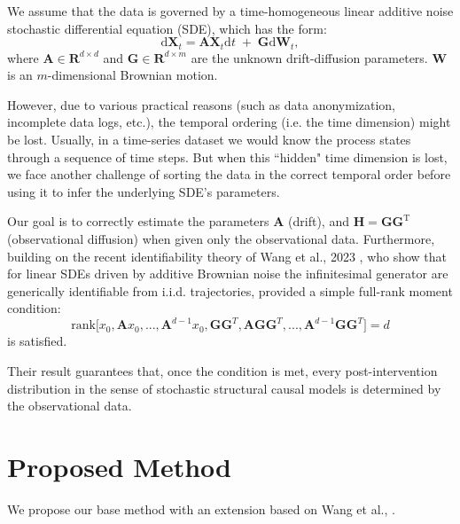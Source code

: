 \documentclass[a4paper, 11pt]{article}
\begin{document}
\begin{sloppypar}
We assume that the data is governed by a time-homogeneous linear additive noise stochastic
differential equation (SDE), which has the form:
\[
\mathrm{d}\mathbf{X}_t 
= 
\mathbf{A}\mathbf{X}_t\mathrm{d}t 
\;+\; 
\mathbf{G}\mathrm{d}\mathbf{W}_t,
\]
where $\mathbf{A} \in \mathbf{R}^{d \times d}$ and $\mathbf{G} \in \mathbf{R}^{d \times m}$ are the 
unknown drift-diffusion parameters. $\mathbf{W}$ is an $m$-dimensional Brownian motion.

However, due to various practical reasons (such as data anonymization, 
incomplete data logs, etc.), the temporal ordering
(i.e. the time dimension) might be lost. Usually, in a time-series dataset we
would know the process states through a sequence of time steps. But when this ``hidden" time
dimension is lost, we face another challenge of sorting the data in the correct temporal order
before using it to infer the underlying SDE's parameters.

Our goal is to correctly estimate the parameters $\mathbf{A}$ (drift), and
$\mathbf{H} = \mathbf{GG}^{\text{T}}$ (observational diffusion) when given only the
observational data. Furthermore, building on the recent identifiability theory of Wang et al., 2023
\cite{NEURIPS2023_ca642f8e}, who show that for linear SDEs driven by additive Brownian noise the
infinitesimal generator are generically identifiable from i.i.d. trajectories, provided
a simple full-rank moment condition:
\begin{equation}
\text{rank}\bigl[x_0, \mathbf{A}x_0, ..., \mathbf{A}^{d-1}x_0,
\mathbf{GG}^T, \mathbf{AGG}^T, ..., \mathbf{A}^{d-1}\mathbf{GG}^T
\bigr] = d
\end{equation}\label{first_eqt}
is satisfied.

Their result guarantees that, once the condition is met, every post-intervention distribution in the
sense of stochastic structural causal models is determined by the observational data.

\section{Proposed Method}\label{s:2}
We propose our base method with an extension based on Wang et al., \cite{NEURIPS2023_ca642f8e}.


\end{sloppypar}
\end{document}
